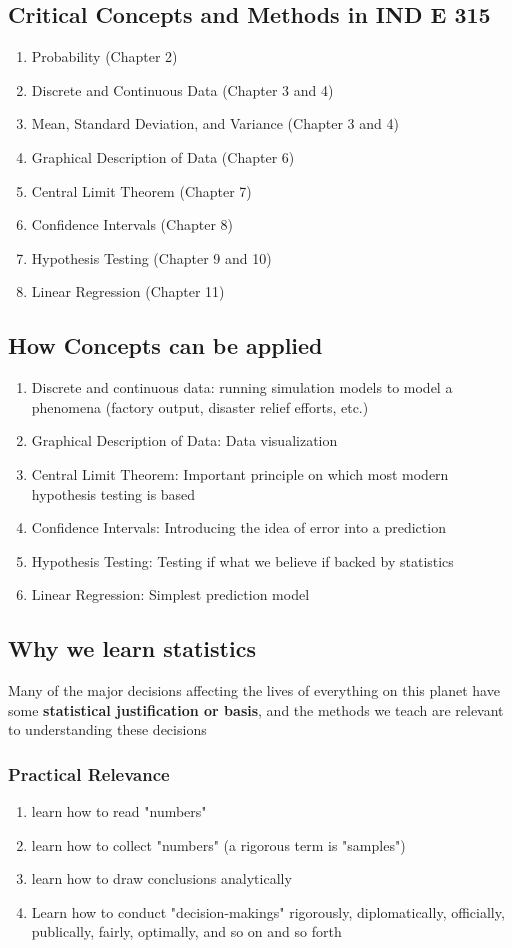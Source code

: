 \documentclass[../IND E 315.tex]{subfiles}
\begin{document}
\subsection*{Critical Concepts and Methods in IND E 315}
\begin{enumerate}
    \item Probability (Chapter 2)
    \item Discrete and Continuous Data (Chapter 3 and 4)
    \item Mean, Standard Deviation, and Variance (Chapter 3 and 4)
    \item Graphical Description of Data (Chapter 6)
    \item Central Limit Theorem (Chapter 7)
    \item Confidence Intervals (Chapter 8)
    \item Hypothesis Testing (Chapter 9 and 10)
    \item Linear Regression (Chapter 11)
\end{enumerate}

\subsection*{How Concepts can be applied}
\begin{enumerate}
    \item Discrete and continuous data: running simulation models to model a phenomena (factory output, disaster relief efforts, etc.)
    \item Graphical Description of Data: Data visualization
    \item Central Limit Theorem: Important principle on which most modern hypothesis testing is based
    \item Confidence Intervals: Introducing the idea of error into a prediction
    \item Hypothesis Testing: Testing if what we believe if backed by statistics
    \item Linear Regression: Simplest prediction model
\end{enumerate}

\subsection*{Why we learn statistics}
Many of the major decisions affecting the lives of everything on this planet have some \textbf{statistical justification or basis}, and the methods we teach are relevant to understanding these decisions
\subsubsection*{Practical Relevance}
\begin{enumerate}
    \item learn how to read "numbers"
    \item learn how to collect "numbers" (a rigorous term is "samples")
    \item learn how to draw conclusions analytically
    \item Learn how to conduct "decision-makings" rigorously, diplomatically, officially, publically, fairly, optimally, and so on and so forth 
\end{enumerate}
\end{document}
